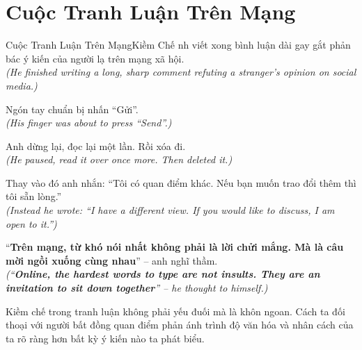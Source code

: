 \section{Cuộc Tranh Luận Trên Mạng}
\begin{truyen}{Cuộc Tranh Luận Trên Mạng}{Kiềm Chế}
nh viết xong bình luận dài gay gắt phản bác ý kiến của người lạ trên mạng xã hội.\\
\textit{(He finished writing a long, sharp comment refuting a stranger's opinion on social media.)}

Ngón tay chuẩn bị nhấn ``Gửi''.\\
\textit{(His finger was about to press ``Send''.)}

Anh dừng lại, đọc lại một lần. Rồi xóa đi.\\
\textit{(He paused, read it over once more. Then deleted it.)}

Thay vào đó anh nhắn: ``Tôi có quan điểm khác. Nếu bạn muốn trao đổi thêm thì tôi sẵn lòng.''\\
\textit{(Instead he wrote: ``I have a different view. If you would like to discuss, I am open to it.'')}

``\textbf{Trên mạng, từ khó nói nhất không phải là lời chửi mắng. Mà là câu mời ngồi xuống cùng nhau}'' – anh nghĩ thầm.\\
\textit{(``\textbf{Online, the hardest words to type are not insults. They are an invitation to sit down together}'' – he thought to himself.)}
\end{truyen}
\begin{baihoc}
  Kiềm chế trong tranh luận không phải yếu đuối mà là khôn ngoan. Cách ta đối thoại với người bất đồng quan điểm phản ánh trình độ văn hóa và nhân cách của ta rõ ràng hơn bất kỳ ý kiến nào ta phát biểu.
\end{baihoc}

